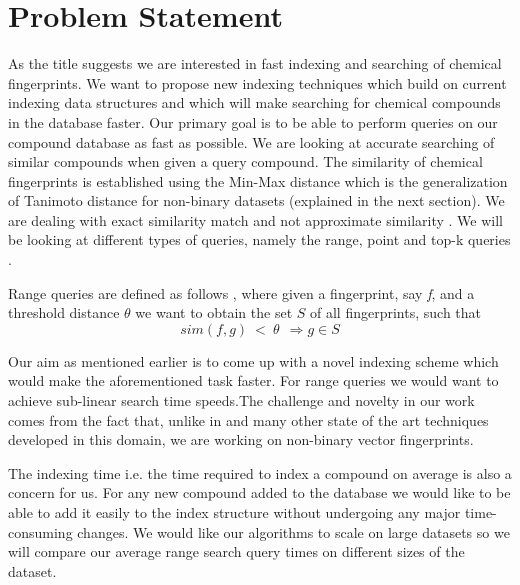 
\section{Problem Statement}

As the title suggests we are interested in fast indexing and searching of chemical fingerprints. We want to propose new indexing techniques which build on current indexing data structures and which will make searching for chemical compounds in the database faster. Our primary goal is to be able to perform queries on our compound database as fast as possible.
We are looking at accurate searching of similar compounds when given a query compound. The similarity of chemical fingerprints is established using the Min-Max distance which is the generalization of Tanimoto distance for non-binary datasets (explained in the next section). We are dealing with exact similarity match and not approximate similarity . We will be looking at different types of queries, namely the range, point and top-k queries .\\

\begin{problem}{
Range queries are defined as follows , where given a fingerprint, say \textit{f}, and a threshold distance \textbf{$\theta$} we want to obtain the set $S$ of all fingerprints, such that 
\begin{equation}
sim(f,g)~ < ~\theta ~~ \Rightarrow  \textbf{$g\in S$}
\end{equation}

}
\end{problem}
 
%

Our aim as mentioned earlier is to come up with a novel indexing scheme which would make the aforementioned task faster. For range queries we would want to achieve sub-linear search time speeds.The challenge and novelty in our work comes from the fact that, unlike in  \citet*{swamidass2007bounds} and many other state of the art techniques developed in this domain, we are working on non-binary vector fingerprints. 

The indexing time i.e. the time required to index a compound on average is also a concern for us. For any new compound added to the database we would like to be able to add it easily to the index structure without undergoing any major time-consuming changes. We would like our algorithms to scale on large datasets so we will compare our average range search query times on different sizes of the dataset.

